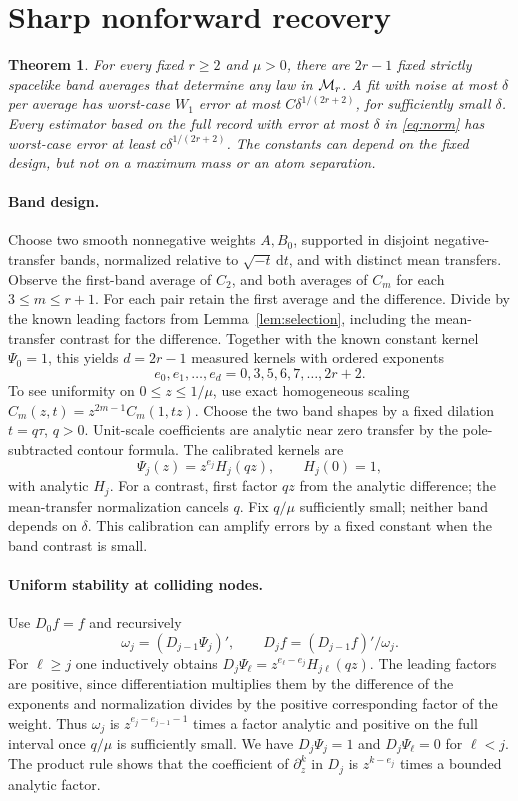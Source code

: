 \documentclass[11pt]{article}
\newtheorem{theorem}{Theorem}
\begin{document}
\section{Sharp nonforward recovery}
\begin{theorem}\label{thm:main}
For every fixed \(r\ge2\) and \(\mu>0\), there are \(2r-1\) fixed strictly spacelike band averages that determine any law in \({\cal M}_r\). A fit with noise at most \(\delta\) per average has worst-case \(W_1\) error at most \(C\delta^{1/(2r+2)}\), for sufficiently small \(\delta\). Every estimator based on the full record with error at most \(\delta\) in \eqref{eq:norm} has worst-case error at least \(c\delta^{1/(2r+2)}\). The constants can depend on the fixed design, but not on a maximum mass or an atom separation.
\end{theorem}

\paragraph{Band design.}
Choose two smooth nonnegative weights \(A,B_0\), supported in disjoint negative-transfer bands, normalized relative to \(\sqrt{-t}\,\mathrm{d}t\), and with distinct mean transfers. Observe the first-band average of \(C_2\), and both averages of \(C_m\) for each \(3\le m\le r+1\). For each pair retain the first average and the difference. Divide by the known leading factors from Lemma~\ref{lem:selection}, including the mean-transfer contrast for the difference. Together with the known constant kernel \(\Psi_0=1\), this yields \(d=2r-1\) measured kernels with ordered exponents
\[
 e_0,e_1,\ldots,e_d=0,3,5,6,7,\ldots,2r+2.
\]
To see uniformity on \(0\le z\le1/\mu\), use exact homogeneous scaling \(C_m(z,t)=z^{2m-1}C_m(1,tz)\). Choose the two band shapes by a fixed dilation \(t=q\tau\), \(q>0\). Unit-scale coefficients are analytic near zero transfer by the pole-subtracted contour formula. The calibrated kernels are
\[
 \Psi_j(z)=z^{e_j}H_j(qz),\qquad H_j(0)=1,
\]
with analytic \(H_j\). For a contrast, first factor \(qz\) from the analytic difference; the mean-transfer normalization cancels \(q\). Fix \(q/\mu\) sufficiently small; neither band depends on \(\delta\). This calibration can amplify errors by a fixed constant when the band contrast is small.

\paragraph{Uniform stability at colliding nodes.}
Use \(D_0f=f\) and recursively
\[
 \omega_j=(D_{j-1}\Psi_j)',\qquad D_j f=(D_{j-1}f)'/\omega_j .
\]
For \(\ell\ge j\) one inductively obtains \(D_j\Psi_\ell=z^{e_\ell-e_j}H_{j\ell}(qz)\). The leading factors are positive, since differentiation multiplies them by the difference of the exponents and normalization divides by the positive corresponding factor of the weight. Thus \(\omega_j\) is \(z^{e_j-e_{j-1}-1}\) times a factor analytic and positive on the full interval once \(q/\mu\) is sufficiently small. We have \(D_j\Psi_j=1\) and \(D_j\Psi_\ell=0\) for \(\ell<j\). The product rule shows that the coefficient of \(\partial_z^k\) in \(D_j\) is \(z^{k-e_j}\) times a bounded analytic factor.
\end{document}
